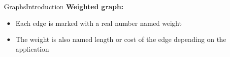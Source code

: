 
\begin{frame}{Graphs}{Introduction}
  \textbf{Weighted graph:}
  \begin{figure}
    \begin{adjustbox}{width=0.75\linewidth}
      
    \end{adjustbox}
    \label{fig:graphs:introduction_weighted}
  \end{figure}
  \begin{itemize}
    \item<3->
      Each edge is marked with a real number named {\color{Mittel-Blau}weight}
    \item<4->
      The {\color{Mittel-Blau}weight} is also named {\color{Mittel-Blau}length}
      or {\color{Mittel-Blau}cost} of the edge depending on the application
  \end{itemize}
\end{frame}



